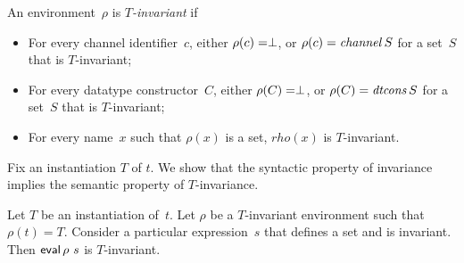 
\begin{definition}
An environment~$\rho$ is \emph{$T$-invariant} if
%
\begin{itemize}
\item For every channel identifier~$c$, either $\rho(c) = \perp$, or
  $\rho(c) = \mathop{\it channel} S$ for a set~$S$ that is $T$-invariant;

\item For every datatype constructor~$C$, either $\rho(C) = \perp$, or
  $\rho(C) = \mathop{\it dtcons} S$ for a set~$S$ that is $T$-invariant;

\item For every name~$x$ such that $\rho(x)$ is a set, $rho(x)$ is
  $T$-invariant. 
\end{itemize}
\end{definition}


Fix an instantiation $T$ of $t$.  We show that the syntactic property of
invariance implies the semantic property of $T$-invariance. 

\begin{lemma}
\label{lem:invariant}
Let $T$ be an instantiation of~$t$.  Let $\rho$ be a $T$-invariant environment
such that $\rho(t) = T$. 
%
Consider a particular expression~$s$ that defines a set and is invariant.
Then $\mathop{\sf eval} \rho~s$ is $T$-invariant.
\end{lemma}

